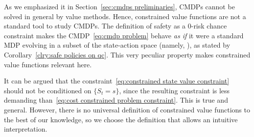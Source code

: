 \begin{remark}
	As we emphasized it in Section~\ref{sec:cmdps preliminaries}, CMDPs cannot be solved in general by value methods. Hence, constrained value functions are not a standard tool to study CMDPs. The definition of safety as a $0$-risk chance constraint makes the CMDP~\eqref{eq:cmdp problem} behave\emph{ as if} it were a standard MDP evolving in a subset of the state-action space (namely, \QV), as stated by Corollary~\ref{clry:safe policies on qc}. This very peculiar property makes constrained value functions relevant here.
\end{remark}

\begin{remark}
	It can be argued that the constraint~\ref{eq:constrained state value constraint} should not be conditioned on $\{S_t = s\}$, since the resulting constraint is less demanding than~\eqref{eq:cost constrained problem constraint}. This is true and general. However, there is no universal definition of constrained value functions to the best of our knowledge, so we choose the definition that allows an intuitive interpretation.
\end{remark}

